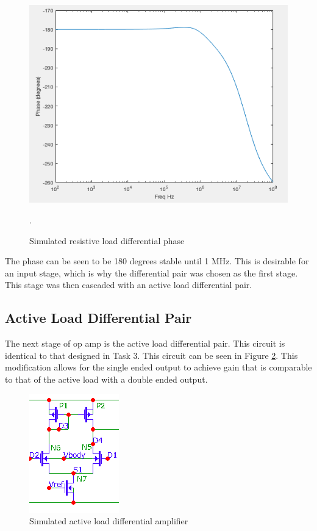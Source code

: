 \begin{figure}[H]
	\begin{center}
		\includegraphics[scale=.30]{Simulations/phasefirststage.png}
		\caption{Simulated resistive load differential phase}
		\label{fig:firststagephase}.
	\end{center}
\end{figure}

The phase can be seen to be 180 degrees stable until 1 MHz. This is desirable for an input stage, which is why the differential pair was chosen as the first stage. This stage was then cascaded with an active load differential pair.


\subsection{Active Load Differential Pair}
The next stage of op amp is the active load differential pair. This circuit is identical to that designed in Task 3.  This circuit can be seen in Figure \ref{fig:ActiveLoadSim}. This modification allows for the single ended output to achieve gain that is comparable to that of the active load with a double ended output.


\begin{figure}[H]
    \begin{center}
    \includegraphics[scale=.85]{Simulations/simactive.png}
    \caption{Simulated active load differential amplifier}
    \label{fig:ActiveLoadSim}
    \end{center}
\end{figure}


